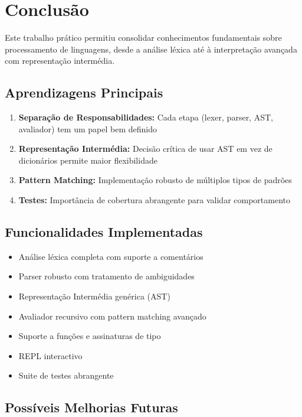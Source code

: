 \documentclass[11pt,a4paper]{report}
\begin{document}
\chapter{Conclusão}

Este trabalho prático permitiu consolidar conhecimentos fundamentais sobre processamento de linguagens, desde a análise léxica até à interpretação avançada com representação intermédia.

\section{Aprendizagens Principais}

\begin{enumerate}
    \item \textbf{Separação de Responsabilidades:} Cada etapa (lexer, parser, AST, avaliador) tem um papel bem definido
    \item \textbf{Representação Intermédia:} Decisão crítica de usar AST em vez de dicionários permite maior flexibilidade
    \item \textbf{Pattern Matching:} Implementação robusto de múltiplos tipos de padrões
    \item \textbf{Testes:} Importância de cobertura abrangente para validar comportamento
\end{enumerate}

\section{Funcionalidades Implementadas}

\begin{itemize}
    \item Análise léxica completa com suporte a comentários
    \item Parser robusto com tratamento de ambiguidades
    \item Representação Intermédia genérica (AST)
    \item Avaliador recursivo com pattern matching avançado
    \item Suporte a funções e assinaturas de tipo
    \item REPL interactivo
    \item Suite de testes abrangente
\end{itemize}

\section{Possíveis Melhorias Futuras}
\end{document}
